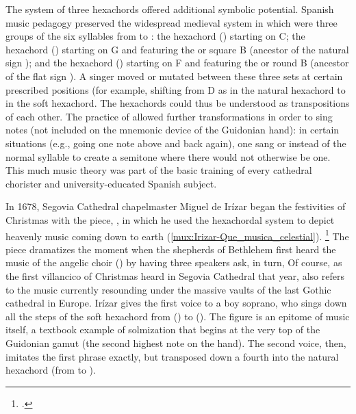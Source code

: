 The system of three hexachords offered additional symbolic potential.
Spanish music pedagogy preserved the widespread medieval system in which were
three groups of the six syllables from  to : the
 hexachord (\XXX[check]) starting on C;
the  hexachord () starting on G and featuring
the  or square B (ancestor of the natural sign \na{}); and the
 hexachord () starting on F and featuring the
 or round B (ancestor of the flat sign \fl{}).
A singer moved or mutated between these three sets at certain prescribed
positions (for example, shifting from D as  in the natural hexachord
to  in the soft hexachord. %
The hexachords could thus be understood as transpositions of each other.
The practice of  allowed further transformations in order
to sing notes  (not included on the mnemonic
device of the Guidonian hand): in certain situations (e.g., going one note
above  and back again), one sang  or  instead of the
normal syllable to create a semitone where there would not otherwise be one.
This much music theory was part of the basic training of every cathedral
chorister and university-educated Spanish subject.%
    \citXXX[sources] %

In 1678, Segovia Cathedral chapelmaster Miguel de Irízar began the festivities
of Christmas with the  piece, , in
which he used the hexachordal system to depict heavenly music coming down to
earth (\cref{mux:Irizar-Que_musica_celestial}).%
    \footnote{.}
The piece dramatizes the moment when the shepherds of Bethlehem first heard the
music of the angelic choir () by having three speakers ask,
in turn,
%
    \citXXX[wlscm32+]
Of course, as the first villancico of Christmas heard in Segovia Cathedral that
year,  also refers to the music currently resounding under
the massive vaults of the last Gothic cathedral in Europe. %
Irízar gives the first voice to a boy soprano, who sings down all the steps of
the soft hexachord from  () to  ().
The figure is an epitome of music itself, a textbook example of solmization
that begins at the very top of the Guidonian gamut (the second highest note on
the hand).
The second voice, then, imitates the first phrase exactly, but transposed down
a fourth into the natural hexachord (from  to ).

